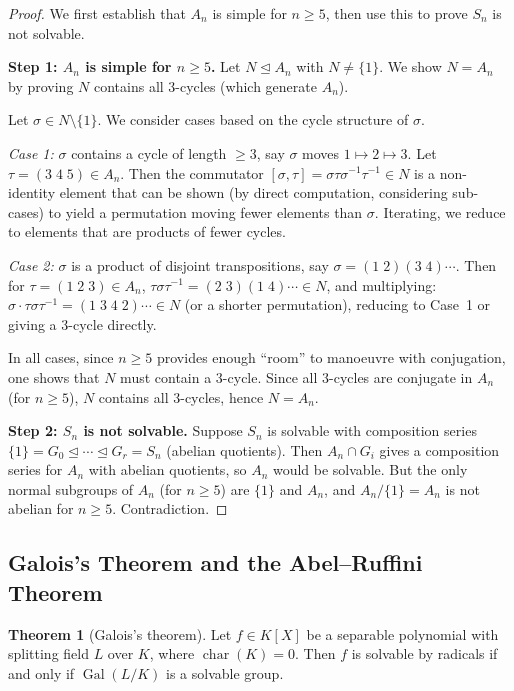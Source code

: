 \documentclass[12pt,a4paper,openany]{book}
\theoremstyle{definition}
\newtheorem{theorem}{Theorem}[chapter]
\theoremstyle{remark}
\DeclareMathOperator{\Gal}{Gal}
\DeclareMathOperator{\chr}{char}
\begin{document}
\begin{proof}
We first establish that $A_{n}$ is simple for $n\geq 5$, then use this
to prove $S_{n}$ is not solvable.

\medskip\noindent
\textbf{Step 1: $A_{n}$ is simple for $n\geq 5$.}\;
Let $N\trianglelefteq A_{n}$ with $N\neq\{1\}$.  We show $N=A_{n}$ by
proving $N$ contains all $3$-cycles (which generate $A_{n}$).

Let $\sigma\in N\setminus\{1\}$.  We consider cases based on the cycle
structure of $\sigma$.

\emph{Case 1:} $\sigma$ contains a cycle of length $\geq 3$, say
$\sigma$ moves $1\mapsto 2\mapsto 3$.  Let $\tau=(3\;4\;5)\in A_{n}$.
Then the commutator $[\sigma,\tau]=\sigma\tau\sigma^{-1}\tau^{-1}\in N$
is a non-identity element that can be shown (by direct computation,
considering sub-cases) to yield a permutation moving fewer elements than
$\sigma$.  Iterating, we reduce to elements that are products of fewer
cycles.

\emph{Case 2:} $\sigma$ is a product of disjoint transpositions, say
$\sigma=(1\;2)(3\;4)\cdots$.  Then for $\tau=(1\;2\;3)\in A_{n}$,
$\tau\sigma\tau^{-1}=(2\;3)(1\;4)\cdots\in N$, and multiplying:
$\sigma\cdot\tau\sigma\tau^{-1}=(1\;3\;4\;2)\cdots\in N$ (or a shorter
permutation), reducing to Case~1 or giving a $3$-cycle directly.

In all cases, since $n\geq 5$ provides enough ``room'' to manoeuvre with
conjugation, one shows that $N$ must contain a $3$-cycle.  Since all
$3$-cycles are conjugate in $A_{n}$ (for $n\geq 5$), $N$ contains all
$3$-cycles, hence $N=A_{n}$.

\medskip\noindent
\textbf{Step 2: $S_{n}$ is not solvable.}\;
Suppose $S_{n}$ is solvable with composition series
$\{1\}=G_{0}\trianglelefteq\cdots\trianglelefteq G_{r}=S_{n}$ (abelian
quotients).  Then $A_{n}\cap G_{i}$ gives a composition series for $A_{n}$
with abelian quotients, so $A_{n}$ would be solvable.  But the only normal
subgroups of $A_{n}$ (for $n\geq 5$) are $\{1\}$ and $A_{n}$, and
$A_{n}/\{1\}=A_{n}$ is not abelian for $n\geq 5$.  Contradiction.
\end{proof}

\subsection{Galois's Theorem and the Abel--Ruffini Theorem}
\label{subsec:galois-theorem}

\begin{theorem}[Galois's theorem]\label{thm:galois-solvability}
Let $f\in K[X]$ be a separable polynomial with splitting field $L$ over $K$,
where $\chr(K)=0$.  Then $f$ is solvable by radicals if and only if
$\Gal(L/K)$ is a solvable group.
\end{theorem}
\end{document}

